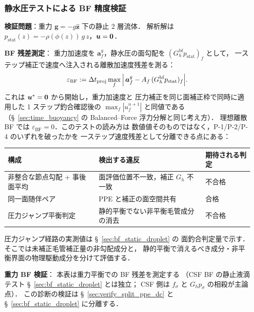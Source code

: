 \subsubsection{静水圧テストによる BF 精度検証}
\label{sec:fccd_bf_hydrostatic}

\noindent\textbf{検証問題}：重力 $\mathbf{g}=-g\hat{\mathbf{z}}$ 下の静止 2 層流体．
解析解は $p_\text{stat}(z) = -\rho(\phi(z))\,g\,z$，$\bm{u}=\bm{0}$．

\noindent\textbf{BF 残差測定}：
重力加速度を $\bm{a}^g_f$，静水圧の面勾配を
$(G_h^\text{bf}p_\text{stat})_f$ として，
一ステップ補正で速度へ注入される離散加速度残差を測る：
\begin{equation}
  \varepsilon_\text{BF}
    := \Delta t_{\mathrm{proj}}
       \max_f\,
       \Bigl|\,
         \bm{a}^g_f
         - A_f\,(G_h^\text{bf}p_\text{stat})_f
       \Bigr|.
  \label{eq:fccd_bf_hydrostatic_metric}
\end{equation}
これは $\bm{u}^*=\bm{0}$ から開始し，重力加速度と
圧力補正を同じ面補正枠で同時に適用した
1 ステップ釣合確認後の $\max_f|u_f^{n+1}|$ と同値である
（§~\ref{sec:time_buoyancy} の
Balanced--Force 浮力分解と同じ考え方）．
理想離散 BF では $\varepsilon_\text{BF}=0$．このテストの読み方は
数値値そのものではなく，P-1/P-2/P-4 のいずれを破ったかを
一ステップ速度残差として分離できる点にある：
\begin{center}
\begin{tabular}{@{}p{}p{}p{}@{}}
\hline
構成 & 検出する違反 & 期待される判定 \\
\hline
非整合な節点勾配 + 事後面平均 & 面評価位置不一致，補正 $G_h$ 不一致 & 不合格 \\
同一面随伴ペア & PPE と補正の面空間共有 & 合格 \\
圧力ジャンプ平衡判定 & 静的平衡でない非平衡毛管成分の消去 & 不合格 \\
\hline
\end{tabular}
\end{center}
\noindent 圧力ジャンプ経路の実測値は §~\ref{sec:bf_static_droplet} の
面釣合判定量で示す．そこでは未補正毛管補正量の非勾配成分と，
静的平衡で消えるべき成分・非平衡界面の物理駆動成分を分けて評価する．

\noindent\textbf{重力 BF 検証}：
本表は重力平衡での BF 残差を測定する
（CSF BF の静止液滴テスト §~\ref{sec:bf_static_droplet} とは独立；
CSF 側は $f_\sigma$ と $G_h p_\sigma$ の相殺が主論点）．
この診断の検証は §~\ref{sec:verify_split_ppe_dc} と §~\ref{sec:bf_static_droplet} に分離する．

